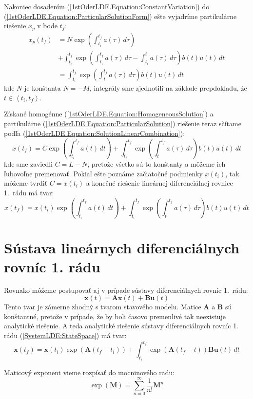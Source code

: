 \documentclass[a4paper, 10pt, ]{article}
\begin{document}
\noindent Nakoniec dosadením (\ref{1stOderLDE.Equation:ConstantVariation}) do (\ref{1stOderLDE.Equation:ParticularSolutionForm}) ešte vyjadríme partikulárne riešenie $x_p$ v bode $t_f$:
\begin{align}
    \label{1stOderLDE.Equation:ParticularSolution}
    \nonumber
    x_p(t_f) &= 
    N \exp \left( \int_{t_i}^{t_f} a(\tau) \, d\tau \right) \\ &+ 
    \int_{t_i}^{t_f} \exp \left( \int_{t_i}^{t_f} a(\tau) \, d\tau - \int_{t_i}^{t} a(\tau) \, d\tau \right) b(t) u(t) \, dt \\ &= 
    \int_{t_i}^{t_f} \exp \left( \int_{t}^{t_f} a(\tau) \, d\tau \right) b(t) u(t) \, dt
\end{align}
kde $N$ je konštanta $N = -M$, integrály sme zjednotili na základe prepdokladu, že $t \in \left< t_i, t_f \right>$.

Získané homogénne (\ref{1stOderLDE.Equation:HomogeneousSolution}) a partikulárne (\ref{1stOderLDE.Equation:ParticularSolution}) riešenie teraz sčítame podľa (\ref{1stOderLDE.Equation:SolutionLinearCombination}):
\begin{equation}
    x(t_f) = 
    C \exp \left( \int_{t_i}^{t_f} a(t) \, dt \right) + 
    \int_{t_i}^{t_f} \exp \left( \int_{t}^{t_f} a(\tau) \, d\tau \right) b(t) u(t) \, dt
\end{equation}
kde sme zaviedli $C = L - N$, pretože všetko sú to konštanty a môžeme ich ľubovoľne premenovať. Pokiaľ ešte poznáme začiatočné podmienky $x(t_i)$, tak môžeme tvrdiť $C = x(t_i)$ a konečné riešenie lineárnej diferenciálnej rovnice 1.~rádu má tvar:
\begin{equation}
    x(t_f) = 
    x(t_i) \exp \left( \int_{t_i}^{t_f} a(t) \, dt \right) + 
    \int_{t_i}^{t_f} \exp \left( \int_{t}^{t_f} a(\tau) \, d\tau \right) b(t) u(t) \, dt 
\end{equation}



\section{Sústava lineárnych diferenciálnych rovníc 1. rádu}

Rovnako môžeme postupovať aj v prípade sústavy diferenciálnych rovníc 1.~rádu:
\begin{equation}
    \label{SystemLDE:StateSpace}
    \dot{\bm{x}}(t) = \bm{A} \bm{x}(t) + \bm{B} \bm{u}(t)
\end{equation}
Tento tvar je zámerne zhodný s tvarom stavového modelu. Matice $\bm{A}$ a $\bm{B}$ sú konštantné, pretože v prípade, že by boli časovo premenlivé tak neexistuje analytické riešenie. A teda analytické riešenie sústavy diferenciálnych rovníc 1. rádu (\ref{SystemLDE:StateSpace}) má tvar:
\begin{equation}
    \bm{x}(t_f) = 
    \bm{x}(t_i) \exp \left( \bm{A} (t_f - t_i) \right) + 
    \int_{t_i}^{t_f} \exp \left( \bm{A} (t_f - t) \right) \bm{B} \bm{u}(t) \, dt 
\end{equation}

Maticový exponent vieme rozpísať do mocninového radu:
\begin{equation}
    \exp(\bm{M}) = \sum_{n = 0}^{\infty} \frac{1}{n!}\bm{M}^n
\end{equation}
\end{document}
